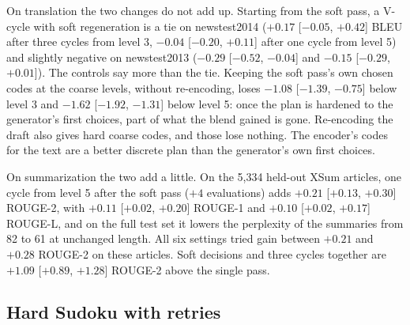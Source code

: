 \documentclass[11pt]{article}
\begin{document}
On translation the two changes do not add up. Starting from the soft pass, a V-cycle with soft regeneration is a tie
on newstest2014 ($+0.17$ [$-0.05$, $+0.42$] BLEU after three cycles from level 3, $-0.04$ [$-0.20$, $+0.11$] after
one cycle from level 5) and slightly negative on newstest2013 ($-0.29$ [$-0.52$, $-0.04$] and $-0.15$ [$-0.29$,
$+0.01$]). The controls say more than the tie. Keeping the soft pass's own chosen codes at the coarse levels, without
re-encoding, loses $-1.08$ [$-1.39$, $-0.75$] below level 3 and $-1.62$ [$-1.92$, $-1.31$] below level 5: once the
plan is hardened to the generator's first choices, part of what the blend gained is gone. Re-encoding the draft also
gives hard coarse codes, and those lose nothing. The encoder's codes for the text are a better discrete plan than
the generator's own first choices.

On summarization the two add a little. On the 5,334 held-out XSum articles, one cycle from level 5 after the soft pass
($+4$ evaluations) adds $+0.21$ [$+0.13$, $+0.30$] ROUGE-2, with $+0.11$ [$+0.02$, $+0.20$] ROUGE-1 and $+0.10$
[$+0.02$, $+0.17$] ROUGE-L, and on the full test set it lowers the perplexity of the summaries from 82 to 61 at
unchanged length. All six settings tried gain between $+0.21$ and $+0.28$ ROUGE-2 on these articles. Soft decisions
and three cycles together are $+1.09$ [$+0.89$, $+1.28$] ROUGE-2 above the single pass.

\subsection{Hard Sudoku with retries}
\label{sec:sudoku}
\end{document}
